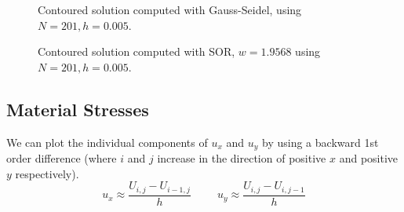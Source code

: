 \documentclass{article}
\numberwithin{equation}{section}
\theoremstyle{definition}
\begin{document}
\begin{figure}[H]
    \centering
    \hfill
    \caption{Contoured solution computed with Gauss-Seidel, using $N=201, h=0.005$.}
    \label{fig:fig3}
\end{figure}

\begin{figure}[H]
    \centering
    \hfill
    \caption{Contoured solution computed with SOR, $w=1.9568$ using $N=201, h=0.005$.}
    \label{fig:fig4}
\end{figure}

\subsection{Material Stresses}
We can plot the individual components of $u_x$ and $u_y$ by using a backward 1st order difference (where $i$ and $j$ increase in the direction of positive $x$ and positive $y$ respectively).
\begin{equation}
    u_x \approx \frac{U_{i,j} - U_{i-1,j}}{h} \hspace{1cm} u_y \approx \frac{U_{i,j} - U_{i,j-1}}{h}
\end{equation}
\end{document}
